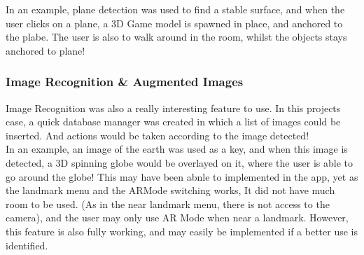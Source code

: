  In an example, plane detection was used to find a stable surface, and when the user clicks on a 
 plane, a 3D Game model is spawned in place, and anchored to the plabe. The user is also to walk around 
 in the room, whilst the objects stays anchored to plane! 

 \subsubsection{Image Recognition \& Augmented Images}
 Image Recognition was also a really interesting feature to use. 
 In this projects case, a quick database manager was created in which a list of images could
  be inserted. And actions would be taken according to the image detected!\\

In an example, an image of the earth was used as a key, and when this image is detected, a 3D spinning 
globe would be overlayed on it, where the user is able to go around the globe!
This may have been abnle to implemented in the app, yet as the landmark menu and the ARMode switching 
works, It did not have much room to be used. (As in the near landmark menu, there is 
not access to the camera), and the user may only use AR Mode when near a landmark. However, this 
feature is also fully working, and may easily be implemented if a better use is identified. 

